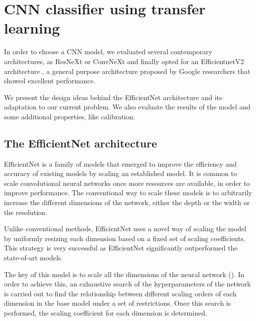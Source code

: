 \chapter{CNN classifier using transfer learning}\label{chapter5}
In order to choose a CNN model, we evaluated several contemporary architectures, as ResNeXt \cite{xie2017aggregated} or ConvNeXt \cite{liu2022convnet} and finally opted for an EfficientnetV2 architecture \cite{tan2021efficientnetv2}, a general purpose architecture proposed by Google researchers that showed excellent performance.

We present the design ideas behind the EfficientNet architecture and its adaptation to our current problem. We also evaluate the results of the model and some additional properties, like calibration.

\section{The EfficientNet architecture} \label{sec:efficientnet}
EfficientNet \cite{efficientNet, googleEfficient} is a family of models that emerged to improve the efficiency and accuracy of existing models by scaling an established model. It is common to scale convolutional neural networks once more resources are available, in order to improve performance. The conventional way to scale these models is to arbitrarily increase the different dimensions of the network, either the depth or the width or the resolution.

Unlike conventional methods, EfficientNet uses a novel way of scaling the model by uniformly resizing each dimension based on a fixed set of scaling coefficients. This strategy is very successful as EfficientNet significantly outperformed the state-of-art models.

The key of this model is to scale all the dimensions of the neural network (). In order to achieve this, an exhaustive search of the hyperparameters of the network is carried out to find the relationship between different scaling orders of each dimension in the base model under a set of restrictions. Once this search is performed, the scaling coefficient for each dimension is determined.

